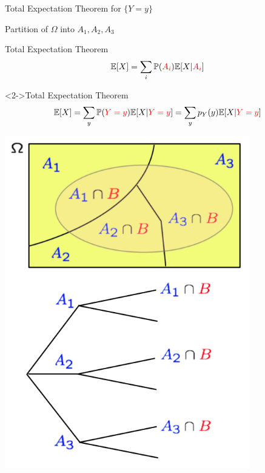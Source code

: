 \begin{frame}{Total Expectation Theorem for $\{Y=y \}$}

{
\plitemsep 0.1in
\bci

\item Partition of $\Omega$ into $A_1,A_2,A_3$


\bigskip
\begin{block}{Total Expectation Theorem}
$$
\mathbb{E}[ X ] = \sum_{i} \mathbb{P}( {\color{red} A_i} ) \mathbb{E}[ X | {\color{red} A_i} ]
$$
\end{block}

\begin{block}<2->{Total Expectation Theorem}
$$
\mathbb{E}[ X ] = \sum_{y} \mathbb{P}( {\color{red} Y=y} ) \mathbb{E}[ X | {\color{red} Y= y} ] = \sum_{y} p_Y(y) \mathbb{E}[ X | {\color{red} Y=y} ] 
$$
\end{block}


\eci 
}
{
\centering
\includegraphics[width=0.8\textwidth]{L2_total_ex.png}
}

\end{frame}

